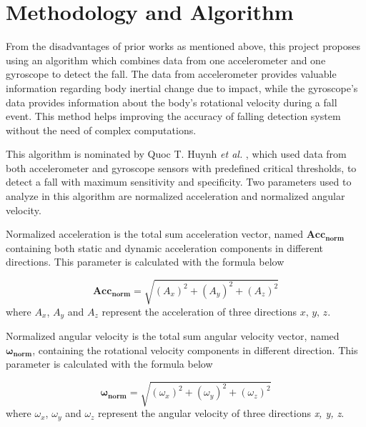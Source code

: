 \documentclass[letterpaper,12pt,titlepage,oneside,final]{book}
\begin{document}
\section{Methodology and Algorithm}
From the disadvantages of prior works as mentioned above, this project proposes using an algorithm which combines data from one accelerometer and one gyroscope to detect the fall. The data from accelerometer provides valuable information regarding body inertial change due to impact, while the gyroscope's data provides information about the body's rotational velocity during a fall event. This method helps improving the accuracy of falling detection system without the need of complex computations.  \par
This algorithm is nominated by Quoc T. Huynh \textit{et al.} \cite{main_quoc}, which used data from both accelerometer and gyroscope sensors with predefined critical thresholds, to detect a fall with maximum sensitivity and specificity. Two parameters used to analyze in this algorithm are normalized acceleration and normalized angular velocity. \par

Normalized acceleration is the total sum acceleration vector, named $\boldsymbol{Acc_{norm}}$ containing both static and dynamic acceleration components in different directions. This parameter is calculated with the formula below 

\begin{equation}
\boldsymbol{Acc_{norm}}=\sqrt{(A_x)^2+(A_y)^2+(A_z)^2}
\end{equation}
where $A_x$, $A_y$ and $A_z$ represent the acceleration of three directions $\textit{x, y, z}$. \par 
Normalized angular velocity is the total sum angular velocity vector, named $\boldsymbol{\omega_{norm}}$, containing the rotational velocity components in different direction. This parameter is calculated with the formula below

\begin{equation}
\boldsymbol{\omega_{norm}}=\sqrt{(\omega_{x})^2+(\omega_{y})^2+(\omega_{z})^2}
\end{equation}
where $\omega_x$, $\omega_y$ and $\omega_z$ represent the angular velocity of three directions \textit{x, y, z}.
\end{document}
